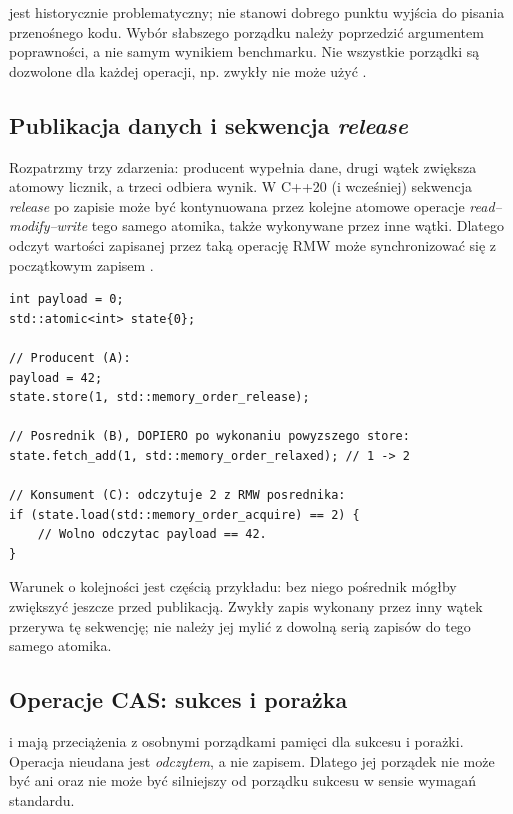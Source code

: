  jest historycznie problematyczny; nie stanowi
dobrego punktu wyjścia do pisania przenośnego kodu. Wybór słabszego
porządku należy poprzedzić argumentem poprawności, a nie samym wynikiem
benchmarku. Nie wszystkie porządki są dozwolone dla każdej operacji,
np. zwykły  nie może użyć .

\subsection{Publikacja danych i sekwencja \emph{release}}

Rozpatrzmy trzy zdarzenia: producent wypełnia dane, drugi wątek
zwiększa atomowy licznik, a trzeci odbiera wynik. W C++20 (i wcześniej)
sekwencja \emph{release} po zapisie  może być kontynuowana
przez kolejne atomowe operacje \emph{read--modify--write} tego samego
atomika, także wykonywane przez inne wątki. Dlatego odczyt 
wartości zapisanej przez taką operację RMW może synchronizować się
z początkowym zapisem .

\begin{lstlisting}[caption={Sekwencja release: fragment przy ustalonej kolejności operacji.}]
int payload = 0;
std::atomic<int> state{0};

// Producent (A):
payload = 42;
state.store(1, std::memory_order_release);

// Posrednik (B), DOPIERO po wykonaniu powyzszego store:
state.fetch_add(1, std::memory_order_relaxed); // 1 -> 2

// Konsument (C): odczytuje 2 z RMW posrednika:
if (state.load(std::memory_order_acquire) == 2) {
    // Wolno odczytac payload == 42.
}
\end{lstlisting}

Warunek o kolejności jest częścią przykładu: bez niego pośrednik mógłby
zwiększyć  jeszcze przed publikacją. Zwykły zapis wykonany
przez inny wątek przerywa tę sekwencję; nie należy jej mylić z dowolną
serią zapisów do tego samego atomika.

\subsection{Operacje CAS: sukces i porażka}

 i  mają
przeciążenia z osobnymi porządkami pamięci dla sukcesu i porażki.
Operacja nieudana jest \emph{odczytem}, a nie zapisem. Dlatego jej porządek
nie może być  ani  oraz nie może być silniejszy
od porządku sukcesu w sensie wymagań standardu.

